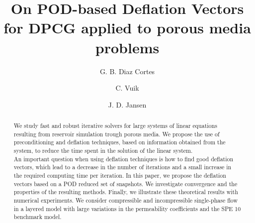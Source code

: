 \documentclass[12pt]{article}
\title{On POD-based Deflation Vectors for DPCG applied to porous media problems}
\author[1]{G. B. Diaz Cortes}
\author[1]{C. Vuik}
\author[2]{J. D. Jansen}
\affil[1]{Department of Applied Mathematics, TU Delft}
\affil[2]{Department of Geoscience \& Engineering, TU Delft}
\numberwithin{equation}{section}
\begin{document}

\maketitle
\begin{abstract}
     We study fast and robust iterative solvers for large systems of  linear equations resulting from reservoir
     simulation trough porous media. We propose the use of preconditioning and deflation techniques, based on 
     information obtained from the system, to reduce the time spent in the solution of the linear system.\\
     An important question when using deflation techniques is how to find good deflation vectors, which lead to a decrease in the number of iterations 
     and a small increase in the required computing time per iteration. In this paper, we propose the deflation vectors
     based on a POD reduced set of snapshots. We investigate convergence and the properties of the resulting methods. 
     Finally, we illustrate these theoretical results with numerical experiments.  
 We consider compressible and incompressible single-phase flow in a layered model with large variations in the 
 permeability coefficients and the SPE 10 benchmark model.\\
\end{abstract}
\end{document}
